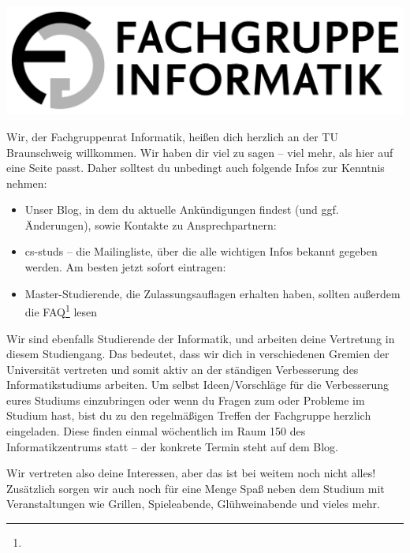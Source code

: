 \documentclass[
  a4paper,              %
  style=screen,
  nexus,                %
]{tubsartcl}
\begin{document}
\pagestyle{empty}


\begin{center}
\noindent\includegraphics[width=.5\textwidth]{bilder/fg-logo/fg-logo.pdf}
\end{center}

\listoftodos

\begin{multicols}{2}

\noindent{}Wir, der Fachgruppenrat Informatik, heißen dich herzlich an der TU Braunschweig willkommen. 
Wir haben dir viel zu sagen – viel mehr, als hier auf eine Seite passt. Daher solltest du unbedingt auch folgende Infos zur Kenntnis nehmen:

\begin{itemize}[topsep=0em,itemsep=-1ex,partopsep=0em,parsep=1ex]
\item Unser Blog, in dem du aktuelle Ankündigungen findest (und ggf. Änderungen), sowie Kontakte zu Ansprechpartnern: \\\fginfoUrl

\item cs-studs -- die Mailingliste, über die alle wichtigen Infos bekannt gegeben werden. Am besten jetzt sofort eintragen: \\

\item Master-Studierende, die Zulassungsauflagen erhalten haben, sollten außerdem die FAQ\footnote{} lesen
\end{itemize}

Wir sind ebenfalls Studierende der Informatik, und arbeiten deine Vertretung in diesem Studiengang. Das bedeutet, dass wir dich in verschiedenen Gremien der Universität vertreten und somit aktiv an der ständigen Verbesserung des Informatikstudiums arbeiten. Um selbst Ideen/Vorschläge für die Verbesserung eures Studiums einzubringen oder wenn du Fragen zum oder Probleme im Studium hast, bist du zu den regelmäßigen Treffen der Fachgruppe herzlich eingeladen. Diese finden einmal wöchentlich im Raum 150 des Informatikzentrums statt – der konkrete Termin steht auf dem Blog.

Wir vertreten also deine Interessen, aber das ist bei weitem noch nicht alles! Zusätzlich sorgen wir auch noch für eine Menge Spaß neben dem Studium mit Veranstaltungen wie Grillen, Spieleabende, Glühweinabende und vieles mehr.


\end{multicols}
\end{document}
